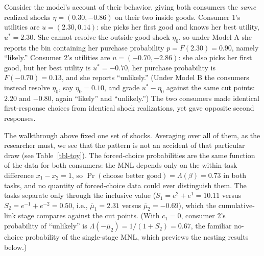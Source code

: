 \documentclass[
  letterpaper,
  DIV=11,
  numbers=noendperiod]{scrartcl}
\theoremstyle{plain}
\theoremstyle{plain}
\theoremstyle{remark}
\begin{document}
Consider the model's account of their behavior, giving both consumers
the \emph{same} realized shocks \(\eta = (0.30, -0.86)\) on their two
inside goods. Consumer 1's utilities are \(u = (2.30, 0.14)\): she picks
her first good and knows her best utility, \(u^* = 2.30\). She cannot
resolve the outside-good shock \(\eta_0\), so under Model A she reports
the bin containing her purchase probability \(p = F(2.30) = 0.90\),
namely ``likely.'' Consumer 2's utilities are \(u = (-0.70, -2.86)\):
she also picks her first good, but her best utility is \(u^* = -0.70\),
her purchase probability is \(F(-0.70) = 0.13\), and she reports
``unlikely.'' (Under Model B the consumers instead resolve \(\eta_0\),
say \(\eta_0 = 0.10\), and grade \(u^* - \eta_0\) against the same cut
points: \(2.20\) and \(-0.80\), again ``likely'' and ``unlikely.'') The
two consumers made identical first-response choices from identical shock
realizations, yet gave opposite second responses.

The walkthrough above fixed one set of shocks. Averaging over all of
them, as the researcher must, we see that the pattern is not an accident
of that particular draw (see Table~\ref{tbl-toy}). The forced-choice
probabilities are the same function of the data for both consumers: the
MNL depends only on the within-task difference \(x_1 - x_2 = 1\), so
\(\Pr(\text{choose better good}) = \Lambda(\beta) = 0.73\) in both
tasks, and no quantity of forced-choice data could ever distinguish
them. The tasks separate only through the inclusive value
(\(S_1 = e^2 + e^1 = 10.11\) versus \(S_2 = e^{-1} + e^{-2} = 0.50\),
i.e., \(\overline{\mu}_1 = 2.31\) versus \(\overline{\mu}_2 = -0.69\)),
which the cumulative-link stage compares against the cut points. (With
\(c_1 = 0\), consumer 2's probability of ``unlikely'' is
\(\Lambda(-\overline{\mu}_2) = 1/(1+S_2) = 0.67\), the familiar
no-choice probability of the single-stage MNL, which previews the
nesting results below.)
\end{document}
